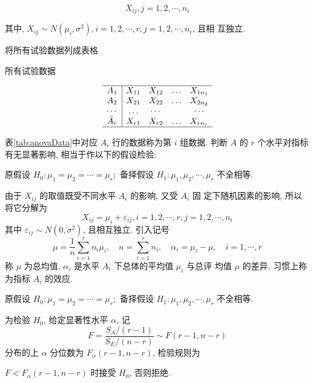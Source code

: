 $$
X_{i j}, j=1,2, \cdots, n_{i}
$$

其中, $X_{i j} \sim N\left(\mu_{i}, \sigma^{2}\right), i=1,2, \cdots, r, j=1,2, \cdots, n_{i}$, 且相
互独立. 

将所有试验数据列成表格

\begin{table}
\caption{所有试验数据}
      \label{tab:anovaData}
$$\begin{array}{c|cccc}
    \hline A_{1} & X_{11} & X_{12} & \ldots & X_{1 n_{1}} \\
    A_{2} & X_{21} & X_{22} & \ldots & X_{2 n_{2}} \\
    \cdots & \ldots & \cdots & & \cdots \\
    \ddot{A}_{r} & X_{r 1} & X_{r 2} & \ldots & X_{r n_{r}} \\
    \hline
    \end{array}
$$  
\end{table}


表\cref{tab:anovaData}中对应 $A_{i}$ 行的数据称为第 $i$ 组数据. 判断 ${A}$ 的 ${r}$ 个水平对指标有无显著影响, 相当于作以下的假设检验:

原假设 $H_{0}: \mu_{1}=\mu_{2}=\cdots=\mu_{r} ;$
备择假设 ${H}_{1}: \mu_{1}, \mu_{2}, \cdots, \mu_{r}$ 不全相等. 

由于 \( X_{i j} \) 的取值既受不同水平 \( A_{i} \) 的影响, 又受 \( A_{i} \) 固 定下随机因素的影响, 所以将它分解为
$$
X_{i j}=\mu_{i}+\varepsilon_{i j}, i=1,2, \cdots, r, j=1,2, \cdots, n_{i}\label{eq:anovaDecomposition}
$$
其中 \( \varepsilon_{i j} \sim N\left({0}, \sigma^{2}\right) \), 且相互独立. 引入记号
$$
\mu=\frac{1}{n} \sum_{i=1}^{r} n_{i} \mu_{i}, \quad n=\sum_{i=1}^{r} n_{i}, \quad \alpha_{i}=\mu_{i}-\mu, \quad i=1, \cdots, r
$$
称 \( \mu \) 为总均值, \( \alpha_{i} \) 是水平 \( A_{i} \) 下总体的平均值 \( \mu_{i} \) 与总评
均值 \( \mu \) 的差异, 习惯上称为指标 \( {A}_{i} \) 的效应. 

\begin{definition}
原假设 $H_{0}: \mu_{1}=\mu_{2}=\cdots=\mu_{r} ;$
备择假设 ${H}_{1}: \mu_{1}, \mu_{2}, \cdots, \mu_{r}$ 不全相等. 

为检验 \( {H}_{0} \), 给定显著性水平 \( \alpha \), 记 \[ {F}=\frac{S_{A} /(r-1)}{S_{E} /(n-r)} \sim F(r-1, n-r) \] 分布的上 \( \alpha \) 分位数为 \( {F}_{\alpha}({r}-{1}, {n}-{r}) \), 检验规则为

\( {F}<{F}_{\alpha}({r}-{1}, {n}-{r}) \) 时接受 \( {H}_{{0}} \), 否则拒绝. 
\end{definition}

